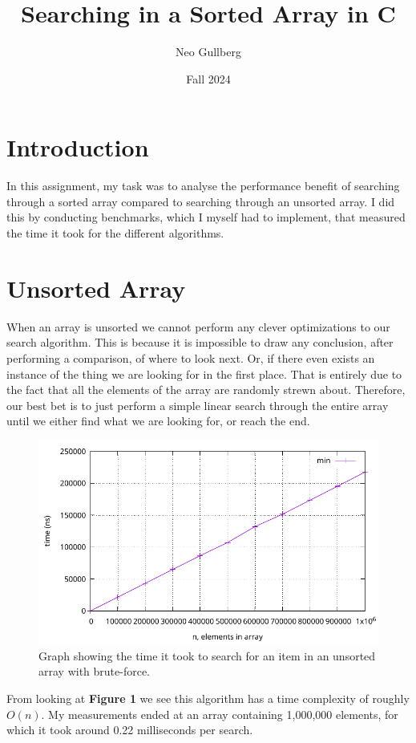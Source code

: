 \documentclass[a4paper, 11pt]{article}
\begin{document}
\title{
	\textbf{Searching in a Sorted Array in C}
}
\author{Neo Gullberg}
\date{Fall 2024}
\maketitle

\section{Introduction}
	In this assignment, my task was to analyse the performance benefit of searching through a sorted array compared to searching through an unsorted array.
	I did this by conducting benchmarks, which I myself had to implement, that measured the time it took for the different algorithms.

\section{Unsorted Array}
	When an array is unsorted we cannot perform any clever optimizations to our search algorithm.
	This is because it is impossible to draw any conclusion, after performing a comparison, of where to look next.
	Or, if there even exists an instance of the thing we are looking for in the first place.
	That is entirely due to the fact that all the elements of the array are randomly strewn about.
	Therefore, our best bet is to just perform a simple linear search through the entire array until we either find what we are looking for, or reach the end.
	\begin{figure}[H]
		\centering
		\includegraphics[scale=0.8]{graphs/plot_brute_unsorted.pdf}
		\caption{
			Graph showing the time it took to search for an item in an unsorted array with brute-force.
		}
	\end{figure}
	\par
	From looking at \textbf{Figure 1} we see this algorithm has a time complexity of roughly \(O(n)\).
	My measurements ended at an array containing 1,000,000 elements, for which it took around 0.22 milliseconds per search.
\end{document}
